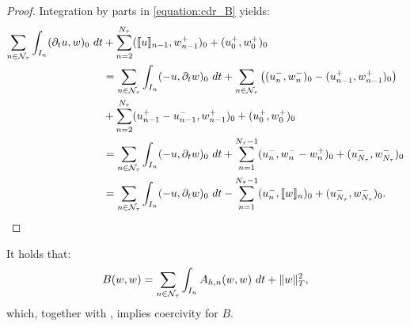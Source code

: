 \begin{proof}
    Integration by parts in \cref{equation:cdr_B} yields:
    \begin{align*}
        \sum_{n \in \mathcal{N}_{\tau}} \int_{I_n} (\partial_t u, w )_0 ~ dt &+ \sum_{n = 2}^{N_{\tau}} (\llbracket u \rrbracket_{n - 1}, w_{n - 1}^+ )_0 + (u_0^+, w_0^+ )_0 \\
        &= \sum_{n \in \mathcal{N}_{\tau}} \int_{I_n} ( -u, \partial_t w )_0 ~ dt + \sum_{n \in \mathcal{N}_{\tau}} \left( (u_n^-, w_n^-)_0 - (u_{n - 1}^+, w_{n - 1}^+)_0 \right) \\
        &+ \sum_{n = 2}^{N_{\tau}} (u_{n - 1}^+ - u_{n - 1}^-, w_{n - 1}^+)_0 + (u_0^+, w_0^+ )_0 \\
        &= \sum_{n \in \mathcal{N}_{\tau}} \int_{I_n} ( -u, \partial_t w )_0 ~ dt + \sum_{n = 1}^{N_{\tau} - 1} (u_n^-, w_n^- - w_n^+)_0 + (u_{N_{\tau}}^-, w_{N_{\tau}}^- )_0 \\
        &= \sum_{n \in \mathcal{N}_{\tau}} \int_{I_n} (-u, \partial_t w )_0 ~ dt - \sum_{n = 1}^{N_{\tau} - 1} (u_n^-, \llbracket w \rrbracket_n )_0 + (u_{N_{\tau}}^-, w_{N_{\tau}}^-)_0.
    \end{align*}
\end{proof}

\begin{lemma}[Coercivity of $B$]
    It holds that:
    \begin{align}
        B(w, w) = \sum_{n \in \mathcal{N}_{\tau}} \int_{I_n} A_{h, n}(w, w) ~ dt + \lVert w \rVert_{T}^2,
    \end{align}
    which, together with , implies coercivity for $B$.
\end{lemma}

